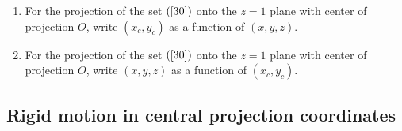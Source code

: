 \begin{exercise}\label{31}\hfil
\begin{enumerate}
\item  For the projection of the set $\left(  \ref{30}\right)  $ onto
the $z=1$ plane with center of projection $O$, write $\left(  x_{c}%
,y_{c}\right)  $ as a function of $\left(  x,y,z\right)  $.

\item For the projection of the set $\left(  \ref{30}\right)  $ onto the $z=1$
plane with center of projection $O$, write $\left(  x,y,z\right)  $ as a
function of $\left(  x_{c},y_{c}\right)  $.
\end{enumerate}
\end{exercise}

\subsection*{Rigid motion in central projection coordinates}

